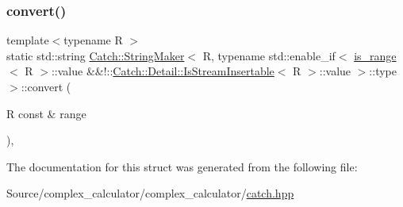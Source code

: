 \subsubsection{\texorpdfstring{convert()}{convert()}}
{\footnotesize\ttfamily template$<$typename R $>$ \\
static std\+::string \mbox{\hyperlink{struct_catch_1_1_string_maker}{Catch\+::\+String\+Maker}}$<$ R, typename std\+::enable\+\_\+if$<$ \mbox{\hyperlink{struct_catch_1_1is__range}{is\+\_\+range}}$<$ R $>$\+::value \&\&!\+::\mbox{\hyperlink{class_catch_1_1_detail_1_1_is_stream_insertable}{Catch\+::\+Detail\+::\+Is\+Stream\+Insertable}}$<$ R $>$\+::value $>$\+::type $>$\+::convert (\begin{DoxyParamCaption}\item[{R const \&}]{range }\end{DoxyParamCaption})\hspace{0.3cm}{\ttfamily [inline]}, {\ttfamily [static]}}



The documentation for this struct was generated from the following file\+:\begin{DoxyCompactItemize}
\item 
Source/complex\+\_\+calculator/complex\+\_\+calculator/\mbox{\hyperlink{catch_8hpp}{catch.\+hpp}}\end{DoxyCompactItemize}
